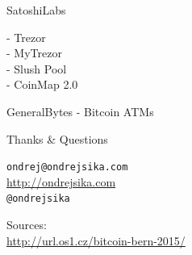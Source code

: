 \documentclass{beamer}
\begin{document}
\begin{frame}

    {\LARGE SatoshiLabs}\\

    \vspace{5mm}

    - Trezor\\
    - MyTrezor\\
    - Slush Pool\\
    - CoinMap 2.0\\

\end{frame}

\begin{frame}

    {\LARGE GeneralBytes - Bitcoin ATMs}\\

    \vspace{5mm}

\end{frame}

\begin{frame}

    {\LARGE Thanks \& Questions}\\

    \vspace{1cm}

    \texttt{ondrej@ondrejsika.com}\\
    \url{http://ondrejsika.com}\\
    \texttt{@ondrejsika}\\

    \vspace{1cm}

    Sources:\\
    \url{http://url.os1.cz/bitcoin-bern-2015/}
\end{frame}
\end{document}

